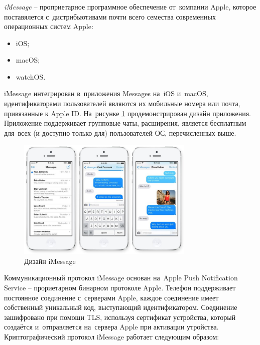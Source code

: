 \subsubsection{}
\label{sec:analysis:research:analogs:imessage}

\textit{iMessage} -- проприетарное программное обеспечение от~компании Apple, которое поставялется с~дистрибьютивами почти всего семества современных операционных систем Apple:
\begin{itemize}
	\item iOS;
	\item macOS;
	\item watchOS.
\end{itemize}

iMessage интегрирован в~приложения Messages на~iOS и~macOS, идентификаторами пользователей являются их мобильные номера или почта, привязанные к Apple ID. На~рисунке \ref{sec:analysis:research:analogs:imessage:design} продемонстрирован дизайн приложения. Приложение поддерживает групповые чаты, расширения, является бесплатным для~всех (и доступно только для) пользователей ОС, перечисленных выше.

\begin{figure}[h]
  \centering
    \includegraphics[width=0.75\textwidth]{inc/img/imdesign.jpeg}
  \caption{Дизайн iMessage}
  \label{sec:analysis:research:analogs:imessage:design}
\end{figure}

Коммуникационный протокол iMessage основан на~Apple Push Notification Service -- прориетарном бинарном протоколе Apple. Телефон поддерживает постоянное соединение с~серверами Apple, каждое соединение имеет собственный уникальный код, выступающий идентификатором. Соединение зашифровано при помощи TLS, используя сертификат устройства, который создаётся и~отправляется на~сервера Apple при активации утройства.
Криптографический протокол iMessage работает следующим образом:

